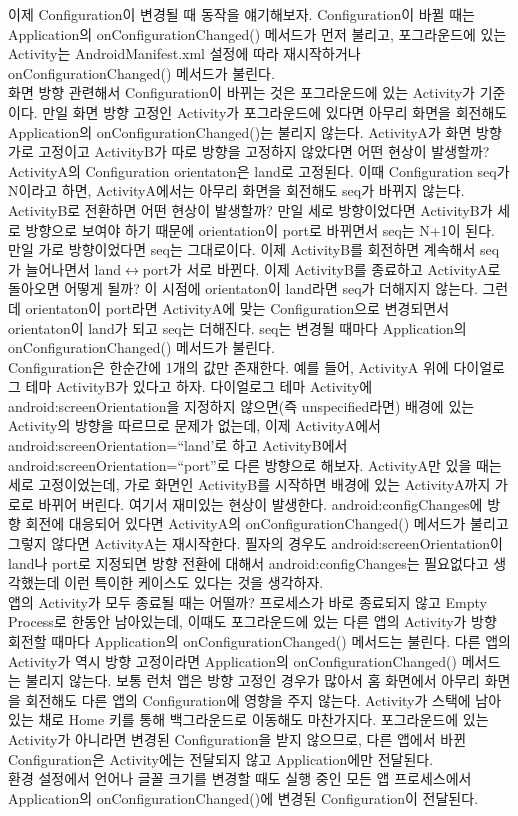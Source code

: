 이제 Configuration이 변경될 때 동작을 얘기해보자. Configuration이 바뀔 때는 Application의 onConfigurationChanged() 메서드가 먼저 불리고, 포그라운드에 있는 Activity는 AndroidManifest.xml 설정에 따라 재시작하거나 onConfigurationChanged() 메서드가 불린다.\\

화면 방향 관련해서 Configuration이 바뀌는 것은 포그라운드에 있는 Activity가 기준이다. 만일 화면 방향 고정인 Activity가 포그라운드에 있다면 아무리 화면을 회전해도 Application의 onConfigurationChanged()는 불리지 않는다. 
ActivityA가 화면 방향 가로 고정이고 ActivityB가 따로 방향을 고정하지 않았다면 어떤 현상이 발생할까? ActivityA의 Configuration orientaton은 land로 고정된다. 이때 Configuration seq가 N이라고 하면, ActivityA에서는 아무리 화면을 회전해도 seq가 바뀌지 않는다. ActivityB로 전환하면 어떤 현상이 발생할까? 만일 세로 방향이었다면 ActivityB가 세로 방향으로 보여야 하기 때문에 orientation이 port로 바뀌면서 seq는 N+1이 된다. 만일 가로 방향이었다면 seq는 그대로이다. 이제 ActivityB를 회전하면 계속해서 seq가 늘어나면서 land$\leftrightarrow$port가 서로 바뀐다. 
이제 ActivityB를 종료하고 ActivityA로 돌아오면 어떻게 될까? 이 시점에 orientaton이 land라면 seq가 더해지지 않는다. 
그런데 orientaton이 port라면 ActivityA에 맞는 Configuration으로 변경되면서 orientaton이 land가 되고 seq는 더해진다. seq는 변경될 때마다 Application의 onConfigurationChanged() 메서드가 불린다.\\

Configuration은 한순간에 1개의 값만 존재한다. 예를 들어, ActivityA 위에 다이얼로그 테마 ActivityB가 있다고 하자. 다이얼로그 테마 Activity에 android:screenOrientation을 지정하지 않으면(즉 unspecified라면) 배경에 있는 Activity의 방향을 따르므로 문제가 없는데, 이제 ActivityA에서 android:screenOrientation=``land'로 하고 ActivityB에서 android:screenOrientation=``port''로 다른 방향으로 해보자. 
ActivityA만 있을 때는 세로 고정이었는데, 가로 화면인 ActivityB를 시작하면 배경에 있는 ActivityA까지 가로로 바뀌어 버린다. 여기서 재미있는 현상이 발생한다. android:configChanges에 방향 회전에 대응되어 있다면 ActivityA의 onConfigurationChanged() 메서드가 불리고 그렇지 않다면 ActivityA는 재시작한다. 필자의 경우도 android:screenOrientation이 land나 port로 지정되면 방향 전환에 대해서 android:configChanges는 필요없다고 생각했는데 이런 특이한 케이스도 있다는 것을 생각하자.\\


앱의 Activity가 모두 종료될 때는 어떨까? 프로세스가 바로 종료되지 않고 Empty Process로 한동안 남아있는데, 이때도 포그라운드에 있는 다른 앱의 Activity가 방향 회전할 때마다 Application의 onConfigurationChanged() 메서드는 불린다. 
다른 앱의 Activity가 역시 방향 고정이라면 Application의 onConfigurationChanged() 메서드는 불리지 않는다. 보통 런처 앱은 방향 고정인 경우가 많아서 홈 화면에서 아무리 화면을 회전해도 다른 앱의 Configuration에 영향을 주지 않는다. 
Activity가 스택에 남아있는 채로 Home 키를 통해 백그라운드로 이동해도 마찬가지다. 포그라운드에 있는 Activity가 아니라면 변경된 Configuration을 받지 않으므로, 다른 앱에서 바뀐 Configuration은 Activity에는 전달되지 않고 Application에만 전달된다.\\

환경 설정에서 언어나 글꼴 크기를 변경할 때도 실행 중인 모든 앱 프로세스에서 Application의 onConfigurationChanged()에 변경된 Configuration이 전달된다.\\




